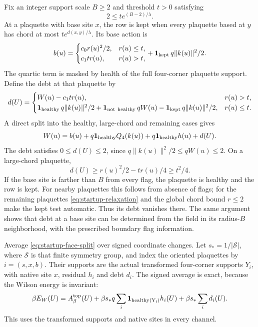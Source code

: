 Fix an integer support scale $B\ge2$ and threshold $t>0$ satisfying
\begin{equation}\label{eq:startup-relaxation}
                  2\le t e^{(B-2)/\lambda}.
\end{equation}
At a plaquette with base site $x$, the row is kept when every
plaquette based at $y$ has chord at most $te^{d(x,y)/\lambda}$.
Its base action is
\[
 b(u)=
 \begin{cases}c_0r(u)^2/2,&r(u)\le t,\\c_1tr(u),&r(u)>t,\end{cases}
       +\mathbf1_{\rm kept}\,q\|k(u)\|^2/2.
\]
The quartic term is masked by health of the full four-corner
plaquette support. Define the debt at that plaquette by
\[
 d(U)=
 \begin{cases}
 W(u)-c_1tr(u),&r(u)>t,\\
 \mathbf1_{\rm healthy}\,q\|k(u)\|^2/2+
 \mathbf1_{\rm not\ healthy}\,qW(u)
       -\mathbf1_{\rm kept}\,q\|k(u)\|^2/2,&r(u)\le t .
 \end{cases}
\]
A direct split into the healthy, large-chord and remaining cases gives
\begin{equation}\label{eq:startup-face-split}
 W(u)=b(u)+q\mathbf1_{\rm healthy}Q_4(k(u))
             +q\mathbf1_{\rm healthy}h(u)+d(U).
\end{equation}
The debt satisfies $0\le d(U)\le2$, since
$q\|k(u)\|^2/2\le qW(u)\le2$. On a large-chord plaquette,
\[
 d(U)\ge r(u)^2/2-tr(u)/4\ge t^2/4.
\]
If the base site is farther than $B$ from every flag, the plaquette
is healthy and the row is kept. For nearby plaquettes this follows
from absence of flags; for the remaining plaquettes
\eqref{eq:startup-relaxation} and the global chord bound $r\le2$
make the kept test automatic. Thus its debt vanishes there.
The same argument shows that debt at a base site can be determined
from the field in its radius-$B$ neighborhood, with the prescribed
boundary flag information.

Average \eqref{eq:startup-face-split} over signed coordinate changes.
Let $s_*=1/|\mathcal S|$, where $\mathcal S$ is that finite symmetry
group, and index the oriented plaquettes by $i=(s,x,b)$.
Their supports are the actual transformed four-corner supports
$Y_i$, with native site $x$, residual $h_i$ and debt $d_i$.
The signed average is exact, because the Wilson energy is invariant:
\begin{equation}\label{eq:startup-signed-split}
 \beta E_W(U)=A^{\rm top}_\beta(U)
       +\beta s_*q\sum_i\mathbf1_{\rm healthy(Y_i)}h_i(U)
       +\beta s_*\sum_i d_i(U).
\end{equation}
This uses the transformed supports and native sites in every channel.

